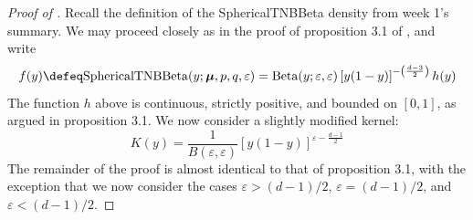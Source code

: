 \begin{proof}[Proof of ]
Recall the definition of the SphericalTNBBeta density from week 1's summary. We may proceed closely as in
the proof of proposition 3.1 of \cite{lederman2026triplyrandomizednegativebinomialbeta}, and write
\[
    f(y) \defeq \mathrm{SphericalTNBBeta}(y; \boldsymbol{\mu}, p, q, \varepsilon) = \text{Beta}(y; \varepsilon, \varepsilon)\left[y(1 - y)\right]^{-\left(\frac{d - 3}{2}\right)}h(y)
\]
The function $h$ above is continuous, strictly positive, and bounded on $[0, 1]$, as argued in proposition 3.1.
We now consider a slightly modified kernel:
\[
    K(y) = \frac{1}{B(\varepsilon, \varepsilon)}\left[y(1 - y)\right]^{\varepsilon - \frac{d - 1}{2}}
\]
The remainder of the proof is almost identical to that of proposition 3.1, with the exception that we now consider
the cases $\varepsilon > (d - 1)/2$, $\varepsilon = (d - 1)/2$, and $\varepsilon < (d - 1)/2$.
\end{proof}


